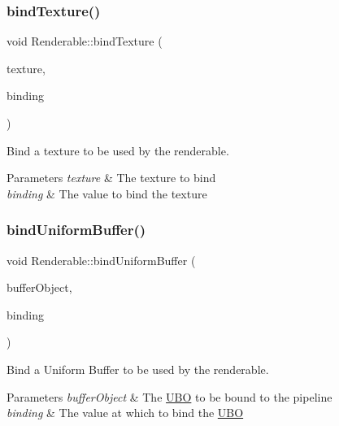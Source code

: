 \subsubsection{\texorpdfstring{bindTexture()}{bindTexture()}}
{\footnotesize\ttfamily void Renderable\+::bind\+Texture (\begin{DoxyParamCaption}\item[{std\+::shared\+\_\+ptr$<$ \mbox{\hyperlink{class_texture}{Texture}} $>$}]{texture,  }\item[{uint32\+\_\+t}]{binding }\end{DoxyParamCaption})}



Bind a texture to be used by the renderable. 


\begin{DoxyParams}{Parameters}
{\em texture} & The texture to bind \\
\hline
{\em binding} & The value to bind the texture \\
\hline
\end{DoxyParams}
\mbox{\label{class_renderable_aac8e561417791f38f6dc5899d580a09a}} 
\subsubsection{\texorpdfstring{bindUniformBuffer()}{bindUniformBuffer()}}
{\footnotesize\ttfamily void Renderable\+::bind\+Uniform\+Buffer (\begin{DoxyParamCaption}\item[{std\+::shared\+\_\+ptr$<$ \mbox{\hyperlink{struct_u_b_o}{U\+BO}} $>$}]{buffer\+Object,  }\item[{uint32\+\_\+t}]{binding }\end{DoxyParamCaption})}



Bind a Uniform Buffer to be used by the renderable. 


\begin{DoxyParams}{Parameters}
{\em buffer\+Object} & The \mbox{\hyperlink{struct_u_b_o}{U\+BO}} to be bound to the pipeline \\
\hline
{\em binding} & The value at which to bind the \mbox{\hyperlink{struct_u_b_o}{U\+BO}} \\
\hline
\end{DoxyParams}
\mbox{\label{class_renderable_a3c39d0269a96782e17df8df793ea2286}} 
